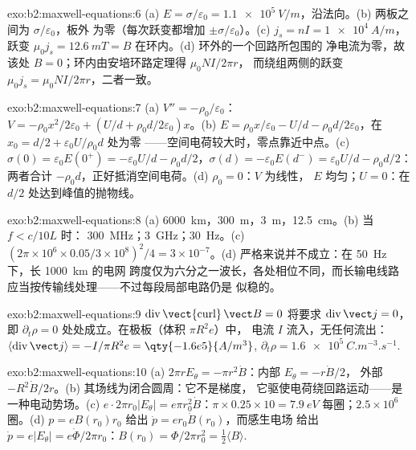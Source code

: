 \begin{solution}{exo:b2:maxwell-equations:6}
(a) $E = \sigma/\varepsilon_0 = \qty{1.1e5}{V/m}$，沿法向。(b) 两板之间为 $\sigma/\varepsilon_0$，板外
为零（每次跃变都增加 $\pm\sigma/\varepsilon_0$）。(c) $j_s = nI = \qty{1e4}{A/m}$，跃变
$\mu_0j_s = \qty{12.6}{mT} = B$ 在环内。(d) 环外的一个回路所包围的
净电流为零，故该处 $B = 0$；环内由安培环路定理得 $\mu_0NI/2\pi r$，
而绕组两侧的跃变 $\mu_0j_s = \mu_0NI/2\pi r$，二者一致。
\end{solution}

\begin{solution}{exo:b2:maxwell-equations:7}
(a) $V'' = -\rho_0/\varepsilon_0$：$V = -\rho_0x^2/2\varepsilon_0 + (U/d + \rho_0d/2\varepsilon_0)x$。(b)
$E = \rho_0x/\varepsilon_0 - U/d - \rho_0d/2\varepsilon_0$，在 $x_0 = d/2 + \varepsilon_0U/\rho_0d$ 处为零
——空间电荷较大时，零点靠近中点。(c) $\sigma(0) = \varepsilon_0E(0^+) =
-\varepsilon_0U/d - \rho_0d/2$，$\sigma(d) = -\varepsilon_0E(d^-) = \varepsilon_0U/d - \rho_0d/2$：两者合计
$-\rho_0d$，正好抵消空间电荷。(d) $\rho_0 = 0$：$V$ 为线性，
$E$ 均匀；$U = 0$：在 $d/2$ 处达到峰值的抛物线。
\end{solution}

\begin{solution}{exo:b2:maxwell-equations:8}
(a) \qty{6000}{km}，\qty{300}{m}，\qty{3}{m}，\qty{12.5}{cm}。(b) 当 $f < c/10L$ 时：
\qty{300}{MHz}；\qty{3}{GHz}；\qty{30}{Hz}。(c) $(2\pi \times 10^6 \times 0.05/3 \times 10^8)^2/4 =
3 \times 10^{-7}$。(d) 严格来说并不成立：在 \qty{50}{Hz} 下，长 \qty{1000}{km} 的电网
跨度仅为六分之一波长，各处相位不同，而长输电线路
应当按传输线处理——不过每段局部电路仍是
似稳的。
\end{solution}

\begin{solution}{exo:b2:maxwell-equations:9}
$\operatorname{div}\operatorname{\vect{curl}}\vect B = 0$ 将要求 $\operatorname{div}\vect j =
0$，即 $\partial_t\rho = 0$ 处处成立。在极板（体积 $\pi R^2e$）中，
电流 $I$ 流入，无任何流出：$\langle\operatorname{div}\vect j\rangle =
-I/\pi R^2e = \qty{-1.6e5}{A/m^3}$, $\partial_t\rho = \qty{+1.6e5}{C.m^{-3}.s^{-1}}$.
\end{solution}

\begin{solution}{exo:b2:maxwell-equations:10}
(a) $2\pi rE_\theta = -\pi r^2\dot B$：内部 $E_\theta = -r\dot B/2$，
外部 $-R^2\dot B/2r$。(b) 其场线为闭合圆周：它不是梯度，
它驱使电荷绕回路运动——是一种电动势场。(c) $e\cdot2\pi r_0
|E_\theta| = e\pi r_0^2\dot B$：$\pi \times 0.25 \times 10 = \qty{7.9}{eV}$ 每圈；$2.5 \times 10^6$
圈。(d) $p = eB(r_0)r_0$ 给出 $\dot p = er_0\dot B(r_0)$，而感生电场
给出 $\dot p = e|E_\theta| = e\dot\Phi/2\pi r_0$：$B(r_0) = \Phi/2\pi r_0^2 =
\tfrac12\langle B\rangle$.
\end{solution}

